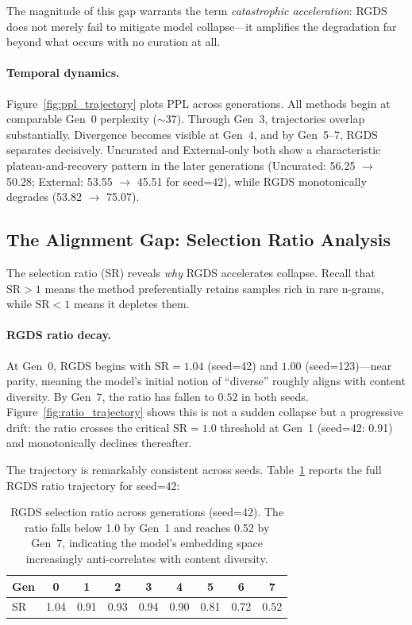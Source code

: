 The magnitude of this gap warrants the term \textit{catastrophic acceleration}: RGDS does not merely fail to mitigate model collapse---it amplifies the degradation far beyond what occurs with no curation at all.

\paragraph{Temporal dynamics.} Figure~\ref{fig:ppl_trajectory} plots PPL across generations. All methods begin at comparable Gen~0 perplexity ($\sim$37). Through Gen~3, trajectories overlap substantially. Divergence becomes visible at Gen~4, and by Gen~5--7, RGDS separates decisively. Uncurated and External-only both show a characteristic plateau-and-recovery pattern in the later generations (Uncurated: 56.25 $\rightarrow$ 50.28; External: 53.55 $\rightarrow$ 45.51 for seed=42), while RGDS monotonically degrades (53.82 $\rightarrow$ 75.07).

\subsection{The Alignment Gap: Selection Ratio Analysis}
\label{sec:alignment_gap}

The selection ratio (SR) reveals \textit{why} RGDS accelerates collapse. Recall that $\text{SR} > 1$ means the method preferentially retains samples rich in rare n-grams, while $\text{SR} < 1$ means it depletes them.

\paragraph{RGDS ratio decay.} At Gen~0, RGDS begins with $\text{SR} = 1.04$ (seed=42) and $1.00$ (seed=123)---near parity, meaning the model's initial notion of ``diverse'' roughly aligns with content diversity. By Gen~7, the ratio has fallen to $0.52$ in both seeds. Figure~\ref{fig:ratio_trajectory} shows this is not a sudden collapse but a progressive drift: the ratio crosses the critical $\text{SR} = 1.0$ threshold at Gen~1 (seed=42: 0.91) and monotonically declines thereafter.

The trajectory is remarkably consistent across seeds. Table~\ref{tab:sr_trajectory} reports the full RGDS ratio trajectory for seed=42:

\begin{table}[t]
\centering
\small
\begin{tabular}{lcccccccc}
\toprule
\textbf{Gen} & 0 & 1 & 2 & 3 & 4 & 5 & 6 & 7 \\
\midrule
SR & 1.04 & 0.91 & 0.93 & 0.94 & 0.90 & 0.81 & 0.72 & 0.52 \\
\bottomrule
\end{tabular}
\caption{RGDS selection ratio across generations (seed=42). The ratio falls below 1.0 by Gen~1 and reaches 0.52 by Gen~7, indicating the model's embedding space increasingly anti-correlates with content diversity.}
\label{tab:sr_trajectory}
\end{table}

